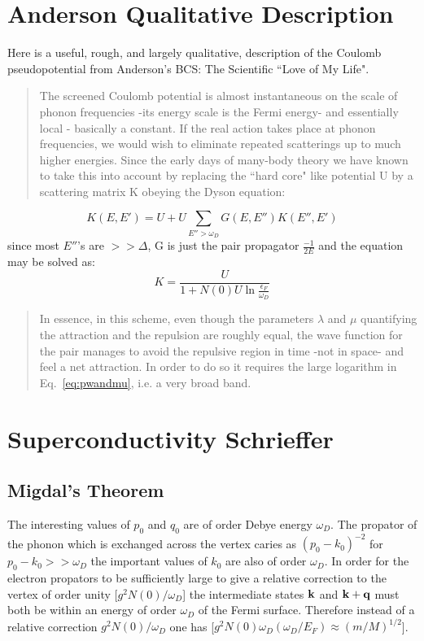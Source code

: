 \section{Anderson Qualitative Description}
%
Here is a useful, rough, and largely qualitative, description of the Coulomb 
pseudopotential from Anderson's BCS: The Scientific ``Love of My Life".

\begin{quote}
The screened Coulomb potential is almost
instantaneous on the scale of phonon frequencies -its energy scale
is the Fermi energy- and essentially local - basically a constant.
If the real action takes place at phonon frequencies, 
we would wish to eliminate repeated
scatterings up to much higher energies. Since
the early days of many-body theory we have
known to take this into account
by replacing the ``hard core" like potential U by a 
scattering matrix K obeying the Dyson equation:
\end{quote}
%
\begin{equation}
K(E,E')=U + U\sum_{E'' > \omega_{D}} G(E,E'') K(E'',E')
\end{equation}
%
since most $E''$'s are $>> \Delta$, G is just the pair propagator $\frac{-1}{2E}$ and the equation 
may be solved as:
%
\begin{equation}
\label{eq:pwandmu}
K=\frac{U}{1+N(0)U\ln\frac{\epsilon_{F}}{\omega_{D}}}
\end{equation}
%
\begin{quote}
In essence, in this scheme, even though the parameters $\lambda$ and $\mu$ quantifying the
attraction and the repulsion are roughly equal, the wave function
for the pair manages to avoid the repulsive region in
time -not in space- and feel a net attraction.
In order to do so it requires the large logarithm
in Eq.~\ref{eq:pwandmu}, i.e. a very broad band.
\end{quote}

\section{Superconductivity Schrieffer}
\subsection{Migdal's Theorem}
\label{sec:migdal}
The interesting values of $p_{0}$ and $q_{0}$ are of order Debye energy $\omega_{D}$.
The propator of the phonon which is exchanged across the vertex caries as $(p_{0}-k_{0})^{-2}$
for $p_{0}-k_{0}>>\omega_{D}$ the important values of $k_{0}$ are also of order $\omega_{D}$. 
In order for the electron propators to be sufficiently large to
give a relative correction to the vertex of order unity [$g^{2}N(0)/\omega_{D}$] the
intermediate states ${\bf k}$ and ${\bf k}+{\bf q}$ must both be within an energy
of order $\omega_{D}$ of the Fermi surface. Therefore instead of a relative correction
$g^{2}N(0)/\omega_{D}$ one has [$g^{2}N(0)\omega_{D}(\omega_{D}/E_{F}) \approx (m/M)^{1/2}$].

